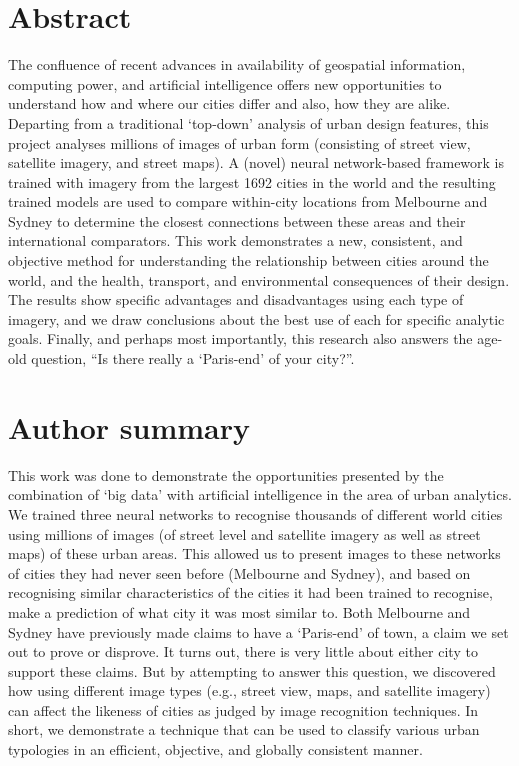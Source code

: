 \documentclass[10pt,letterpaper,hidelinks]{article}
\begin{document}
\section*{Abstract}
The confluence of recent advances in availability of geospatial information, computing power, and artificial intelligence offers new opportunities to understand how and where our cities differ and also, how they are alike. Departing from a traditional `top-down' analysis of urban design features, this project analyses millions of images of urban form (consisting of street view, satellite imagery, and street maps). A (novel) neural network-based framework is trained with imagery from the largest 1692 cities in the world and the resulting trained models are used to compare within-city locations from Melbourne and Sydney to determine the closest connections between these areas and their international comparators. This work demonstrates a new, consistent, and objective method for understanding the relationship between cities around the world, and the health, transport, and environmental consequences of their design. The results show specific advantages and disadvantages using each type of imagery, and we draw conclusions about the best use of each for specific analytic goals. Finally, and perhaps most importantly, this research also answers the age-old question, ``Is there really a `Paris-end' of your city?''.


\section*{Author summary}
This work was done to demonstrate the opportunities presented by the combination of `big data' with artificial intelligence in the area of urban analytics. We trained three neural networks to recognise thousands of different world cities using millions of images (of street level and satellite imagery as well as street maps) of these urban areas. This allowed us to present images to these networks of cities they had never seen before (Melbourne and Sydney), and based on recognising similar characteristics of the cities it had been trained to recognise, make a prediction of what city it was most similar to. Both Melbourne and Sydney have previously made claims to have a `Paris-end' of town, a claim we set out to prove or disprove. It turns out, there is very little about either city to support these claims. But by attempting to answer this question, we discovered how using different image types (e.g., street view, maps, and satellite imagery) can affect the likeness of cities as judged by image recognition techniques. In short, we demonstrate a technique that can be used to classify various urban typologies in an efficient, objective, and globally consistent manner.
\end{document}

